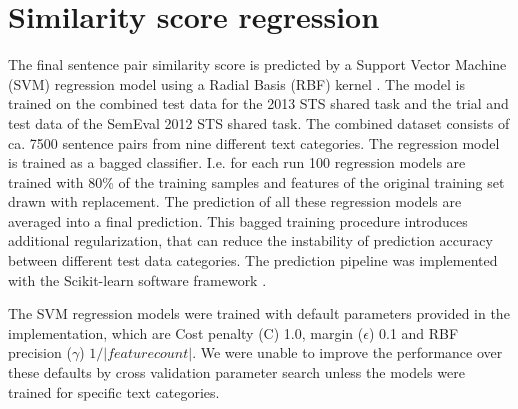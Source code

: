 
\section{Similarity score regression}
\label{sec:regression}

The final sentence pair similarity score is predicted by a Support Vector Machine (SVM) regression model using a Radial Basis (RBF) kernel \cite{VapnikEA:97}. The model is trained on the combined test data for the 2013 STS shared task and the trial and test data of the SemEval 2012 STS shared task. The combined dataset consists of ca. 7500 sentence pairs from nine different text categories. The regression model is trained as a bagged classifier. I.e. for each run 100 regression models are trained with 80\% of the training samples and features of the original training set drawn with replacement. The prediction of all these regression models are averaged into a final prediction. This bagged training procedure introduces additional regularization, that can  reduce the instability of prediction accuracy between different test data categories. The prediction pipeline was implemented with the Scikit-learn software framework \cite{scikit-learn}.

The SVM regression models were trained with default parameters provided in the implementation, which are Cost penalty (C) 1.0, margin ($\epsilon$) 0.1 and RBF precision ($\gamma$) $1/|feature count|$. We were unable to improve the performance over these defaults by cross validation parameter search unless the models were trained for specific text categories.

